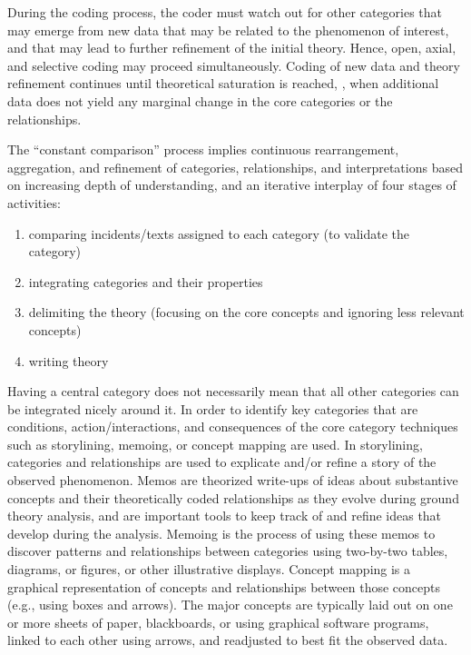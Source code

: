 During the coding process, the coder must watch out for other categories that may emerge from new data that may be related to the phenomenon of interest, and that may lead to further refinement of the initial theory. Hence, open, axial, and selective coding may proceed simultaneously. Coding of new data and theory refinement continues until theoretical saturation is reached, \ie, when additional data does not yield any marginal change in the core categories or the relationships.

The ``constant comparison'' process implies continuous rearrangement, aggregation, and refinement of categories, relationships, and interpretations based on increasing depth of understanding, and an iterative interplay of four stages of activities:

\begin{enumerate}
	\item comparing incidents/texts assigned to each category (to validate the category)
	\item integrating categories and their properties
	\item delimiting the theory (focusing on the core concepts and ignoring less relevant concepts)
	\item writing theory
\end{enumerate}

Having a central category does not necessarily mean that all other categories can be integrated nicely around it. In order to identify key categories that are conditions, action/interactions, and consequences of the core category techniques such as storylining, memoing, or concept mapping are used. In storylining, categories and relationships are used to explicate and/or refine a story of the observed phenomenon. Memos are theorized write-ups of ideas about substantive concepts and their theoretically coded relationships as they evolve during ground theory analysis, and are important tools to keep track of and refine ideas that develop during the analysis. Memoing is the process of using these memos to discover patterns and relationships between categories using two-by-two tables, diagrams, or figures, or other illustrative displays. Concept mapping is a graphical representation of concepts and relationships between those concepts (e.g., using boxes and arrows). The major concepts are typically laid out on one or more sheets of paper, blackboards, or using graphical software programs, linked to each other using arrows, and readjusted to best fit the observed data.

